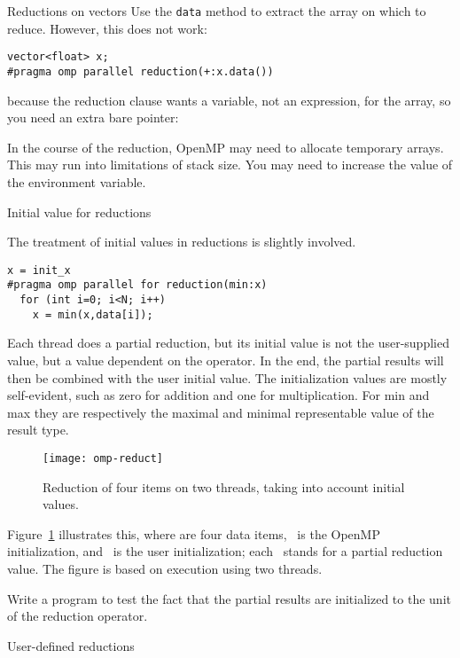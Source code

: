\begin{cppnote}{Reductions on vectors}
  Use the \lstinline{data} method to extract the array
  on which to reduce. However, this does not work:
\begin{lstlisting}[language=omp]
vector<float> x;
#pragma omp parallel reduction(+:x.data())
\end{lstlisting}
  because the reduction clause wants a variable, not an expression,
  for the array, so you need an extra bare pointer:
\end{cppnote}

In the course of the reduction, OpenMP may need to allocate
temporary arrays. This may run into limitations of stack size.
You may need to increase the value of the 
environment variable.

 {Initial value for reductions}

The treatment of initial values in reductions is slightly involved.
\begin{lstlisting}[language=omp]
  x = init_x
#pragma omp parallel for reduction(min:x)
  for (int i=0; i<N; i++)
    x = min(x,data[i]);
\end{lstlisting}
Each thread does a partial reduction, but its initial value is not the
user-supplied  value, but a value dependent on the
operator. In the end, the partial results will then be combined with
the user initial value.
The initialization values are mostly self-evident, such as zero for
addition and one for multiplication. For min and max they are
respectively the maximal and minimal representable value of the result type.

\begin{figure}[ht]
  \texttt{[image: omp-reduct]}
  \caption{Reduction of four items on two threads, taking into account
    initial values.}
  \label{fig:omp-reduct}  
\end{figure}
%
Figure~\ref{fig:omp-reduct} illustrates this, where  are
four data items, ~is the OpenMP initialization, and ~is the
user initialization; each ~stands for a partial reduction value.
The figure is based on execution using two threads.

\begin{exercise}
  Write a program to test the fact that the partial results
  are initialized to the unit of the reduction operator.
\end{exercise}

 {User-defined reductions}

